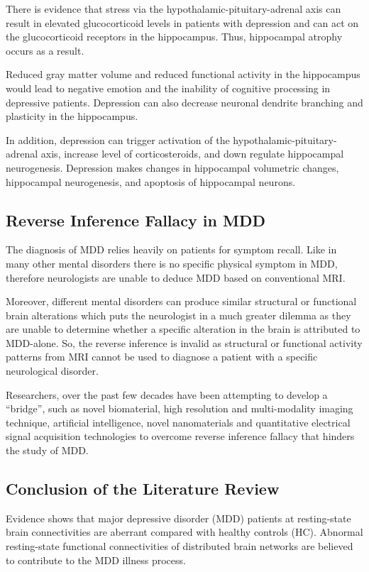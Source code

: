 \documentclass{article}
\begin{document}
There is evidence that stress via the hypothalamic-pituitary-adrenal
axis can result in elevated glucocorticoid levels in patients with
depression and can act on the glucocorticoid receptors in the
hippocampus. Thus, hippocampal atrophy occurs as a result.

Reduced gray matter volume and reduced functional activity in the
hippocampus would lead to negative emotion and the inability of
cognitive processing in depressive patients.  Depression can also
decrease neuronal dendrite branching and plasticity in the
hippocampus.

In addition, depression can trigger activation of the
hypothalamic-pituitary-adrenal axis, increase level of
corticosteroids, and down regulate hippocampal neurogenesis.
Depression makes changes in hippocampal volumetric changes,
hippocampal neurogenesis, and apoptosis of hippocampal neurons.

\subsection{Reverse Inference Fallacy in MDD}

The diagnosis of MDD relies heavily on patients for symptom recall.
Like in many other mental disorders there is no specific physical
symptom in MDD, therefore neurologists are unable to deduce MDD based
on conventional MRI.

Moreover, different mental disorders can produce similar structural or
functional brain alterations which puts the neurologist in a much
greater dilemma as they are unable to determine whether a specific
alteration in the brain is attributed to MDD-alone.  So, the reverse
inference is invalid as structural or functional activity patterns
from MRI cannot be used to diagnose a patient with a specific
neurological disorder.

Researchers, over the past few decades have been attempting to develop
a “bridge”, such as novel biomaterial, high resolution and
multi-modality imaging technique, artificial intelligence, novel
nanomaterials and quantitative electrical signal acquisition
technologies to overcome reverse inference fallacy that hinders the
study of MDD.

\subsection*{Conclusion of the Literature Review}

Evidence shows that major depressive disorder (MDD) patients at
resting-state brain connectivities are aberrant compared with healthy
controls (HC). Abnormal resting-state functional connectivities of
distributed brain networks are believed to contribute to the MDD
illness process.
\end{document}
